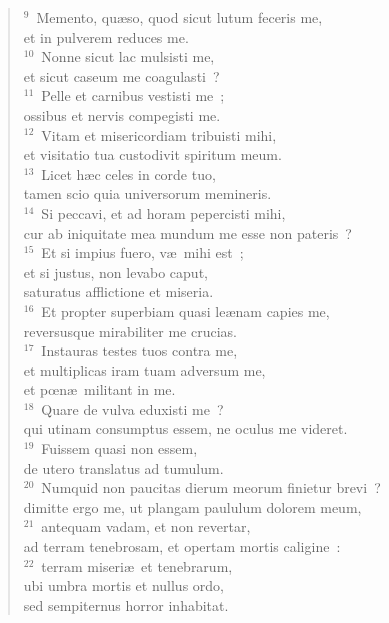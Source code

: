 \begin{flushleft}
\begin{verse}
${}^{9}$~Memento, qu\ae so, quod sicut lutum feceris me,\\ et in pulverem reduces me.\\
${}^{10}$~Nonne sicut lac mulsisti me,\\ et sicut caseum me coagulasti~?\\
${}^{11}$~Pelle et carnibus vestisti me~;\\ ossibus et nervis compegisti me.\\
${}^{12}$~Vitam et misericordiam tribuisti mihi,\\ et visitatio tua custodivit spiritum meum.\\
${}^{13}$~Licet h\ae c celes in corde tuo,\\ tamen scio quia universorum memineris.\\
${}^{14}$~Si peccavi, et ad horam pepercisti mihi,\\ cur ab iniquitate mea mundum me esse non pateris~?\\
${}^{15}$~Et si impius fuero, v\ae\ mihi est~;\\ et si justus, non levabo caput,\\ saturatus afflictione et miseria.\\
${}^{16}$~Et propter superbiam quasi le\ae nam capies me,\\ reversusque mirabiliter me crucias.\\
${}^{17}$~Instauras testes tuos contra me,\\ et multiplicas iram tuam adversum me,\\ et pœn\ae\ militant in me.\\
${}^{18}$~Quare de vulva eduxisti me~?\\ qui utinam consumptus essem, ne oculus me videret.\\
${}^{19}$~Fuissem quasi non essem,\\ de utero translatus ad tumulum.\\
${}^{20}$~Numquid non paucitas dierum meorum finietur brevi~?\\ dimitte ergo me, ut plangam paululum dolorem meum,\\
${}^{21}$~antequam vadam, et non revertar,\\ ad terram tenebrosam, et opertam mortis caligine~:\\
${}^{22}$~terram miseri\ae\ et tenebrarum,\\ ubi umbra mortis et nullus ordo,\\ sed sempiternus horror inhabitat.\end{verse}\end{flushleft}



